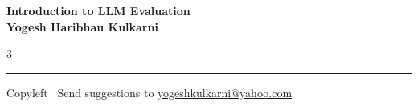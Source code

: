 \documentclass[8pt,landscape]{article}
\begin{document}
\footnotesize


\begin{center}
\Large{\textbf{Introduction to LLM Evaluation\\ Yogesh Haribhau Kulkarni}}
\end{center}

\begin{multicols}{3}

\end{multicols}

\rule{\linewidth}{0.25pt}
\scriptsize
Copyleft \textcopyleft\  Send suggestions to
\href{http://www.yogeshkulkarni.com}{yogeshkulkarni@yahoo.com}
\end{document}
